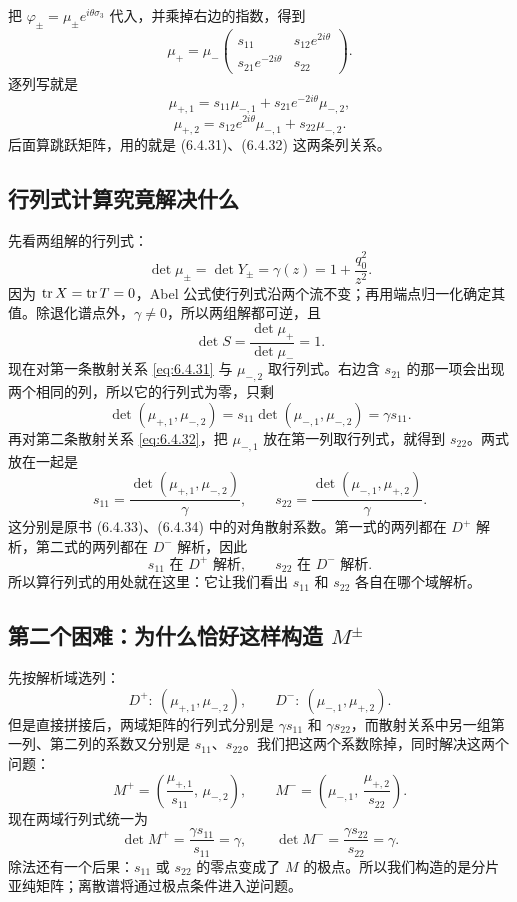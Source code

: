 \documentclass[lang=cn,scheme=chinese,mode=simple,device=normal,color=blue,math=cm,thmcnt=section,12pt]{elegantbook}
\newcommand{\eqq}[2]{\tag{#1}\label{eq:#1}#2}
\begin{document}
把 $\varphi_\pm=\mu_\pm e^{i\theta\sigma_3}$ 代入，并乘掉右边的指数，得到
\[
\mu_+=\mu_-
\begin{pmatrix}s_{11}&s_{12}e^{2i\theta}\\
s_{21}e^{-2i\theta}&s_{22}\end{pmatrix}.
\]
逐列写就是
\begin{equation}\eqq{6.4.31}{\mu_{+,1}
=s_{11}\mu_{-,1}+s_{21}e^{-2i\theta}\mu_{-,2},}\end{equation}
\begin{equation}\eqq{6.4.32}{\mu_{+,2}
=s_{12}e^{2i\theta}\mu_{-,1}+s_{22}\mu_{-,2}.}\end{equation}
后面算跳跃矩阵，用的就是 (6.4.31)、(6.4.32) 这两条列关系。

\subsection*{行列式计算究竟解决什么}
先看两组解的行列式：
\begin{equation}\eqq{6.4.28}{\det\mu_\pm=\det Y_\pm
=\gamma(z)=1+\dfrac{q_0^2}{z^2}.}\end{equation}
因为 $\operatorname{tr} X=\operatorname{tr} T=0$，Abel 公式使行列式沿两个流不变；再用端点归一化确定其值。除退化谱点外，$\gamma\ne0$，所以两组解都可逆，且
\[
\det S=\dfrac{\det\mu_+}{\det\mu_-}=1.
\]
现在对第一条散射关系 \eqref{eq:6.4.31} 与 $\mu_{-,2}$ 取行列式。右边含 $s_{21}$ 的那一项会出现两个相同的列，所以它的行列式为零，只剩
\[
\det(\mu_{+,1},\mu_{-,2})
=s_{11}\det(\mu_{-,1},\mu_{-,2})=\gamma s_{11}.
\]
再对第二条散射关系 \eqref{eq:6.4.32}，把 $\mu_{-,1}$ 放在第一列取行列式，就得到 $s_{22}$。两式放在一起是
\[
s_{11}=\dfrac{\det(\mu_{+,1},\mu_{-,2})}{\gamma},
\qquad
s_{22}=\dfrac{\det(\mu_{-,1},\mu_{+,2})}{\gamma}.
\]
这分别是原书 (6.4.33)、(6.4.34) 中的对角散射系数。第一式的两列都在 $D^+$ 解析，第二式的两列都在 $D^-$ 解析，因此
\[
s_{11}\text{ 在 }D^+\text{ 解析},\qquad
s_{22}\text{ 在 }D^-\text{ 解析}.
\]
所以算行列式的用处就在这里：它让我们看出 $s_{11}$ 和 $s_{22}$ 各自在哪个域解析。

\subsection*{第二个困难：为什么恰好这样构造 \(M^\pm\)}
先按解析域选列：
\[
D^+:\ (\mu_{+,1},\mu_{-,2}),\qquad
D^-:\ (\mu_{-,1},\mu_{+,2}).
\]
但是直接拼接后，两域矩阵的行列式分别是 $\gamma s_{11}$ 和 $\gamma s_{22}$，而散射关系中另一组第一列、第二列的系数又分别是 $s_{11}$、$s_{22}$。我们把这两个系数除掉，同时解决这两个问题：
\begin{equation}\eqq{6.5.1}{M^+=\left(\dfrac{\mu_{+,1}}{s_{11}},\,\mu_{-,2}\right),
\qquad M^-=\left(\mu_{-,1},\,\dfrac{\mu_{+,2}}{s_{22}}\right).}\end{equation}
现在两域行列式统一为
\[
\det M^+=\dfrac{\gamma s_{11}}{s_{11}}=\gamma,\qquad
\det M^-=\dfrac{\gamma s_{22}}{s_{22}}=\gamma.
\]
除法还有一个后果：$s_{11}$ 或 $s_{22}$ 的零点变成了 $M$ 的极点。所以我们构造的是分片亚纯矩阵；离散谱将通过极点条件进入逆问题。
\end{document}

